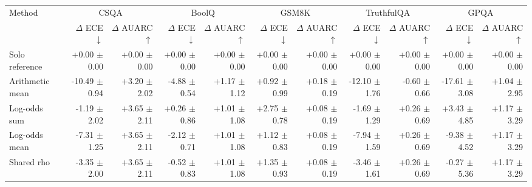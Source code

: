 \begin{tabular}{lrrrrrrrrrr}
\toprule
Method & \multicolumn{2}{c}{CSQA} & \multicolumn{2}{c}{BoolQ} & \multicolumn{2}{c}{GSM8K} & \multicolumn{2}{c}{TruthfulQA} & \multicolumn{2}{c}{GPQA} \\
 & $\Delta$ ECE $\downarrow$ & $\Delta$ AUARC $\uparrow$ & $\Delta$ ECE $\downarrow$ & $\Delta$ AUARC $\uparrow$ & $\Delta$ ECE $\downarrow$ & $\Delta$ AUARC $\uparrow$ & $\Delta$ ECE $\downarrow$ & $\Delta$ AUARC $\uparrow$ & $\Delta$ ECE $\downarrow$ & $\Delta$ AUARC $\uparrow$ \\
\midrule
Solo reference & +0.00 {\scriptsize $\pm$ 0.00} & +0.00 {\scriptsize $\pm$ 0.00} & +0.00 {\scriptsize $\pm$ 0.00} & +0.00 {\scriptsize $\pm$ 0.00} & +0.00 {\scriptsize $\pm$ 0.00} & +0.00 {\scriptsize $\pm$ 0.00} & +0.00 {\scriptsize $\pm$ 0.00} & +0.00 {\scriptsize $\pm$ 0.00} & +0.00 {\scriptsize $\pm$ 0.00} & +0.00 {\scriptsize $\pm$ 0.00} \\
Arithmetic mean & -10.49 {\scriptsize $\pm$ 0.94} & +3.20 {\scriptsize $\pm$ 2.02} & -4.88 {\scriptsize $\pm$ 0.54} & +1.17 {\scriptsize $\pm$ 1.12} & +0.92 {\scriptsize $\pm$ 0.99} & +0.18 {\scriptsize $\pm$ 0.19} & -12.10 {\scriptsize $\pm$ 1.76} & -0.60 {\scriptsize $\pm$ 0.66} & -17.61 {\scriptsize $\pm$ 3.08} & +1.04 {\scriptsize $\pm$ 2.95} \\
Log-odds sum & -1.19 {\scriptsize $\pm$ 2.02} & +3.65 {\scriptsize $\pm$ 2.11} & +0.26 {\scriptsize $\pm$ 0.86} & +1.01 {\scriptsize $\pm$ 1.08} & +2.75 {\scriptsize $\pm$ 0.78} & +0.08 {\scriptsize $\pm$ 0.19} & -1.69 {\scriptsize $\pm$ 1.29} & +0.26 {\scriptsize $\pm$ 0.69} & +3.43 {\scriptsize $\pm$ 4.85} & +1.17 {\scriptsize $\pm$ 3.29} \\
Log-odds mean & -7.31 {\scriptsize $\pm$ 1.25} & +3.65 {\scriptsize $\pm$ 2.11} & -2.12 {\scriptsize $\pm$ 0.71} & +1.01 {\scriptsize $\pm$ 1.08} & +1.12 {\scriptsize $\pm$ 0.83} & +0.08 {\scriptsize $\pm$ 0.19} & -7.94 {\scriptsize $\pm$ 1.59} & +0.26 {\scriptsize $\pm$ 0.69} & -9.38 {\scriptsize $\pm$ 4.52} & +1.17 {\scriptsize $\pm$ 3.29} \\
Shared rho & -3.35 {\scriptsize $\pm$ 2.00} & +3.65 {\scriptsize $\pm$ 2.11} & -0.52 {\scriptsize $\pm$ 0.83} & +1.01 {\scriptsize $\pm$ 1.08} & +1.35 {\scriptsize $\pm$ 0.93} & +0.08 {\scriptsize $\pm$ 0.19} & -3.46 {\scriptsize $\pm$ 1.61} & +0.26 {\scriptsize $\pm$ 0.69} & -0.27 {\scriptsize $\pm$ 5.36} & +1.17 {\scriptsize $\pm$ 3.29} \\

\end{tabular}
